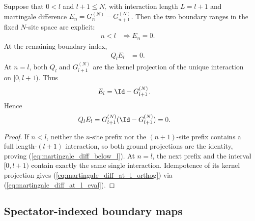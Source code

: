 \begin{lemma}
    \label{thm:fixed-volume-c3-boundary-indices}
    \leanok
    Suppose that $0<l$ and $l+1\leq N$, with interaction length $L=l+1$ and
    martingale difference $E_n=G_n^{(N)}-G_{n+1}^{(N)}$.  Then the two
    boundary ranges in the fixed $N$-site space are explicit:
    \begin{align}
        n<l & \Longrightarrow E_n=0.
        \label{eq:martingale_diff_below_l}
    \end{align}
    At the remaining boundary index,
    \begin{align}
        Q_lE_l & =0.
        \label{eq:martingale_diff_at_l_orthog}
    \end{align}
    At $n=l$, both $Q_l$ and $G_{l+1}^{(N)}$ are the kernel projection of the
    unique interaction on $[0,l+1)$.  Thus
    \begin{align}
        E_l & =\Id-G_{l+1}^{(N)}.
        \notag
    \end{align}
    Hence
    \begin{align}
        Q_lE_l & =G_{l+1}^{(N)}(\Id-G_{l+1}^{(N)})=0.
        \label{eq:martingale_diff_at_l_eval}
    \end{align}
\end{lemma}

\begin{proof}
    \leanok
    If $n<l$, neither the $n$-site prefix nor the $(n+1)$-site prefix contains a full
    length-$(l+1)$ interaction, so both ground projections are the identity, proving (\ref{eq:martingale_diff_below_l}).
    At $n=l$, the next prefix and the interval $[0,l+1)$ contain exactly the
    same single interaction.  Idempotence of its kernel projection gives
    (\ref{eq:martingale_diff_at_l_orthog}) via (\ref{eq:martingale_diff_at_l_eval}).
\end{proof}

\subsection{Spectator-indexed boundary maps}\label{subsec:spectator_boundary_maps}

